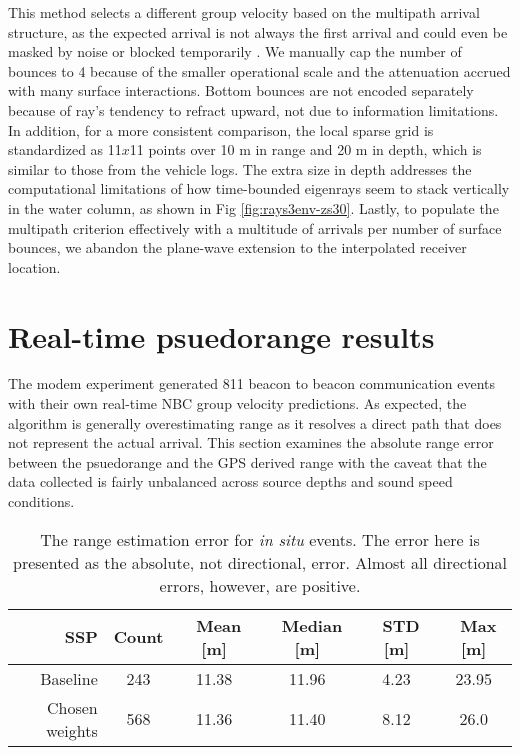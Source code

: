 This method selects a different group velocity based on the multipath arrival structure, as the expected arrival is not always the first arrival and could even be masked by noise or blocked temporarily \citep{deffenbaugh_acoustic_1996}.
We manually cap the number of bounces to 4 because of the smaller operational scale and the attenuation accrued with many surface interactions.
Bottom bounces are not encoded separately because of ray's tendency to refract upward, not due to information limitations. 
In addition, for a more consistent comparison, the local sparse grid is standardized as 11$x$11 points over 10 m in range and 20 m in depth, which is similar to those from the vehicle logs.
The extra size in depth addresses the computational limitations of how time-bounded eigenrays seem to stack vertically in the water column, as shown in Fig \ref{fig:rays3env-zs30}.
Lastly, to populate the multipath criterion effectively with a multitude of arrivals per number of surface bounces, we abandon the plane-wave extension to the interpolated receiver location.


\FloatBarrier
\section{\label{sec:realtime} Real-time psuedorange results}

The modem experiment generated 811 beacon to beacon communication events with their own real-time NBC group velocity predictions.
As expected, the algorithm is generally overestimating range as it resolves a direct path that does not represent the actual arrival.
This section examines the absolute range error between the psuedorange and the GPS derived range with the caveat that the data collected is fairly unbalanced across source depths and sound speed conditions.

\begin{table}[h!]
\renewcommand{\arraystretch}{1.3}
\centering
\begin{tabular}{r|c|c|c|c|c}
SSP & Count & ~Mean [m] & ~Median [m] & ~STD [m] & ~Max [m] \\ \hline
Baseline & 243 & 11.38 & 11.96 & 4.23 & 23.95 \\ 
Chosen weights & 568 & 11.36 & 11.40 & 8.12 & 26.0 \\
\toprule
\end{tabular}
\caption[Range estimation error for \textit{in situ} events]{The range estimation error for \textit{in situ} events. The error here is presented as the absolute, not directional, error. Almost all directional errors, however, are positive.}
\label{tab:rangeErrorInSitu}
\end{table}

